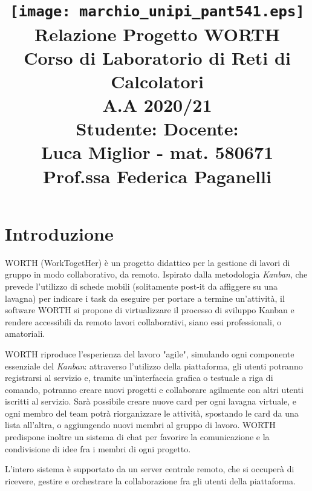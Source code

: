 \documentclass{article}
\title{
    \texttt{[image: marchio\_unipi\_pant541.eps]}\\[1cm]
    Relazione Progetto WORTH \\[1ex]
    \large{Corso di Laboratorio di Reti di Calcolatori\\[1ex] A.A 2020/21}\\[1.5cm]
    \noindent \textbf{Studente:} \hfill \textbf{Docente:}\\
    \noindent Luca Miglior - mat. 580671 \hfill Prof.ssa Federica Paganelli
}
\date{}
\begin{document}
\maketitle

\tableofcontents{}
\newpage


\section{Introduzione}
WORTH (WorkTogetHer) è un progetto didattico per la gestione di lavori di gruppo in modo collaborativo, da remoto. Ispirato dalla metodologia \emph{Kanban}, che prevede l'utilizzo di schede mobili (solitamente post-it da affiggere su una lavagna) per indicare i task da eseguire per portare a termine un'attività, il software WORTH si propone di virtualizzare il processo di sviluppo Kanban e rendere accessibili da remoto lavori collaborativi, siano essi professionali, o amatoriali.

WORTH riproduce l'esperienza del lavoro "agile", simulando ogni componente essenziale del \emph{Kanban}: attraverso l'utilizzo della piattaforma, gli utenti potranno registrarsi al servizio e, tramite un'interfaccia grafica o testuale a riga di comando, potranno creare nuovi progetti e collaborare agilmente con altri utenti iscritti al servizio. Sarà possibile creare nuove card per ogni lavagna virtuale, e ogni membro del team potrà riorganizzare le attività, spostando le card da una lista all'altra, o aggiungendo nuovi membri al gruppo di lavoro. WORTH predispone inoltre un sistema di chat per favorire la comunicazione e la condivisione di idee fra i membri di ogni progetto.

L'intero sistema è supportato da un server centrale remoto, che si occuperà di ricevere, gestire e orchestrare la collaborazione fra gli utenti della piattaforma.
\end{document}
